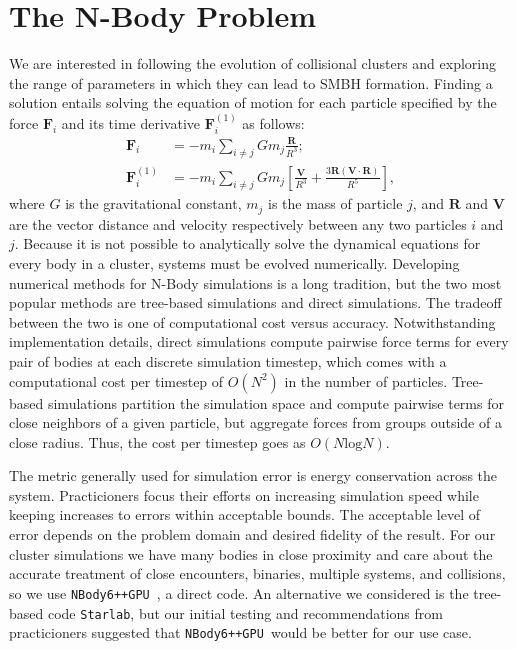 \documentclass{princeton_astro_thesis}
\newcommand\nbody{\texttt{NBody6++GPU }}
\numberwithin{equation}{section}
\begin{document}
\section{The N-Body Problem}
We are interested in following the evolution of collisional clusters and exploring the range of parameters in which they can lead to \ac{SMBH} formation. Finding a solution entails solving the equation of motion for each particle specified by the force $\mathbf{F}_{i}$ and its time derivative $\mathbf{F}^{(1)}_{i}$ as follows:
\begin{subequations}
    \begin{align}
    \mathbf{F}_{i} &= -m_{i}\sum_{i \neq j} Gm_{j} \frac{\mathbf{R}}{R^3}; \\
    \mathbf{F}^{(1)}_{i} &=  -m_{i}\sum_{i \neq j} Gm_{j} \left[ \frac{\mathbf{V}}{R^3} + \frac{3\mathbf{R}(\mathbf{V} \cdot \mathbf{R})}{R^5}\right],
    \end{align}
    \label{eqn:gravmotion}
\end{subequations}
where $G$ is the gravitational constant, $m_j$ is the mass of particle $j$, and $\mathbf{R}$ and $\mathbf{V}$ are the vector distance and velocity respectively between any two particles $i$ and $j$.  Because it is not possible to analytically solve the dynamical equations for every body in a cluster, systems must be evolved numerically. Developing numerical methods for N-Body simulations is a long tradition, but the two most popular methods are tree-based simulations and direct simulations. The tradeoff between the two is one of computational cost versus accuracy. Notwithstanding implementation details, direct simulations compute pairwise force terms for every pair of bodies at each discrete simulation timestep, which comes with a computational cost per timestep of $O(N^2)$ in the number of particles.  Tree-based simulations partition the simulation space and compute pairwise terms for close neighbors of a given particle, but aggregate forces from groups outside of a close radius. Thus, the cost per timestep goes as $O(N\mathrm{log}N)$.

The metric generally used for simulation error is energy conservation across the system. Practicioners focus their efforts on increasing simulation speed while keeping increases to errors within acceptable bounds. The acceptable level of error depends on the problem domain and desired fidelity of the result.  For our cluster simulations we have many bodies in close proximity and care about the accurate treatment of close encounters, binaries, multiple systems, and collisions, so we use \nbody, a direct code.  An alternative we considered is the tree-based code \texttt{Starlab}, but our initial testing and recommendations from practicioners suggested that \nbody would be better for our use case.
\end{document}

